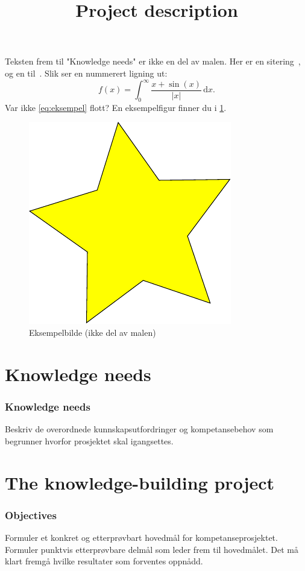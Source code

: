 \documentclass[11pt,a4paper,british]{article}
\title{Project description}
\begin{document}
\maketitle

Teksten frem til "Knowledge needs" er ikke en del av malen.
Her er en sitering~\cite{einstein}, og en til~\cite{dirac}.
Slik ser en nummerert ligning ut:
\begin{equation}
	\label{eq:eksempel}
	f(x) = \int_0^\infty \frac{x + \sin(x)}{\lvert x \rvert} \, \mathrm{d} x.
\end{equation}
Var ikke \cref{eq:eksempel} flott?
En eksempelfigur finner du i \cref{fig:eksempel}.
\begin{figure}
	\centering
	\includegraphics{eksempelbilde}
	\caption{Eksempelbilde (ikke del av malen)\label{fig:eksempel}}
\end{figure}

\part{Knowledge needs}

\section{Knowledge needs}
Beskriv de overordnede kunnskapsutfordringer og kompetansebehov som begrunner hvorfor prosjektet skal igangsettes.

\part{The knowledge-building project}

\section{Objectives}
Formuler et konkret og etterprøvbart hovedmål for kompetanseprosjektet.
Formuler punktvis etterprøvbare delmål som leder frem til hovedmålet.
Det må klart fremgå hvilke resultater som forventes oppnådd.
\end{document}
